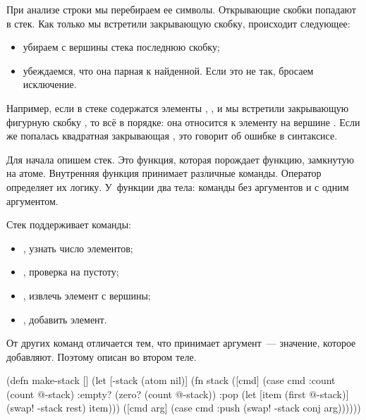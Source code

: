 При анализе строки мы перебираем ее символы. Открывающие скобки попадают в стек. Как только мы встретили закрывающую скобку, происходит следующее:

\begin{itemize}

\item
  убираем с вершины стека последнюю скобку;

\item
  убеждаемся, что она парная к найденной. Если это не так, бросаем исключение.

\end{itemize}

Например, если в стеке содержатся элементы \code{(}, \code{[}, \code{\{} и мы встретили закрывающую фигурную скобку \code{\}}, то всё в порядке: она относится к элементу на вершине \code{\{}. Если же попалась квадратная закрывающая \code{]}, это говорит об ошибке в синтаксисе.

\begin{english}
  \begin{text}
"(..[..{..}.." ;; ok
"(..[..{..].." ;; error
  \end{text}
\end{english}

Для начала опишем стек. Это функция, которая порождает функцию, замкнутую на атоме. Внутренняя функция принимает различные команды. Оператор  определяет их логику. У~функции два тела: команды без аргументов и с одним аргументом.

Стек поддерживает команды:

\begin{itemize}

\item
  , узнать число элементов;

\item
  , проверка на пустоту;

\item
  , извлечь элемент с вершины;

\item
  , добавить элемент.

\end{itemize}

От других команд  отличается тем, что принимает аргумент~--- значение, которое добавляют. Поэтому  описан во втором теле.

\begin{english}
  \begin{clojure/lines}
(defn make-stack
  []
  (let [-stack
        (atom nil)]
    (fn stack
      ([cmd]
       (case cmd
         :count (count @-stack)
         :empty? (zero? (count @-stack))
         :pop (let [item (first @-stack)]
                (swap! -stack rest)
                item)))
      ([cmd arg]
       (case cmd
         :push
         (swap! -stack conj arg))))))
  \end{clojure/lines}
\end{english}

